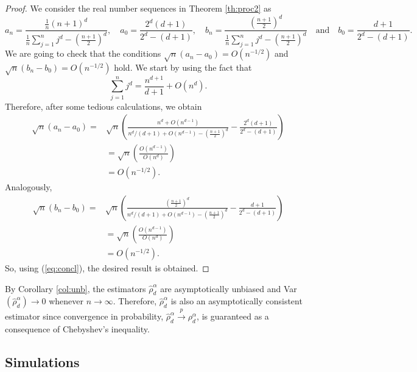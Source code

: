 \documentclass[11pt,a4paper]{article}
\begin{document}
\begin{proof}
    We consider the real number sequences in Theorem \ref{th:proc2} as $$a_n=\frac{\frac{1}{n}(n+1)^d}{\frac{1}{n}\sum_{j=1}^nj^d-(\frac{n+1}{2})^d},\quad a_0=\frac{2^d(d+1)}{2^d-(d+1)},\quad b_n=\frac{(\frac{n+1}{2})^d}{\frac{1}{n}\sum_{j=1}^nj^d-(\frac{n+1}{2})^d}\quad\text{and}\quad b_0=\frac{d+1}{2^d-(d+1)}.$$
    We are going to check that the conditions $\sqrt{n}(a_n-a_0)=O(n^{-1/2})$ and $\sqrt{n}(b_n-b_0)=O(n^{-1/2})$ hold. We start by using the fact that
    $$\sum_{j=1}^nj^d=\frac{n^{d+1}}{d+1}+O(n^d).$$
    Therefore, after some tedious calculations, we obtain 
    \begin{align*}
        \sqrt{n}(a_n-a_0)=&\sqrt{n}\left(\frac{n^d+O(n^{d-1})}{n^d/(d+1)+O(n^{d-1})-\left(\frac{n+1}{2}\right)^d}-\frac{2^d(d+1)}{2^d-(d+1)}\right)\\
        &=\sqrt{n}\left(\frac{O(n^{d-1})}{O(n^d)}\right)\\
        &=O(n^{-1/2}).
    \end{align*}
    Analogously, 
    \begin{align*}
        \sqrt{n}(b_n-b_0)=&\sqrt{n}\left(\frac{(\frac{n+1}{2})^d}{n^d/(d+1)+O(n^{d-1})-\left(\frac{n+1}{2}\right)^d}-\frac{d+1}{2^d-(d+1)}\right)\\
        &=\sqrt{n}\left(\frac{O(n^{d-1})}{O(n^d)}\right)\\
        &=O(n^{-1/2}).
    \end{align*}
    So, using (\ref{eq:concl}), the desired result is obtained.
\end{proof}

By Corollary \ref{col:unb}, the estimators $\widehat{\rho}_d^\alpha$ are asymptotically unbiased and Var$(\widehat{\rho}_d^\alpha)\longrightarrow 0$ whenever $n\longrightarrow\infty$. Therefore, $\widehat{\rho}_d^\alpha$ is also an asymptotically consistent estimator since convergence in probability, $\widehat{\rho}_d^\alpha\xrightarrow{p}\rho_d^\alpha$, is guaranteed  as a consequence of Chebyshev's inequality.

\subsection{Simulations}
\end{document}
